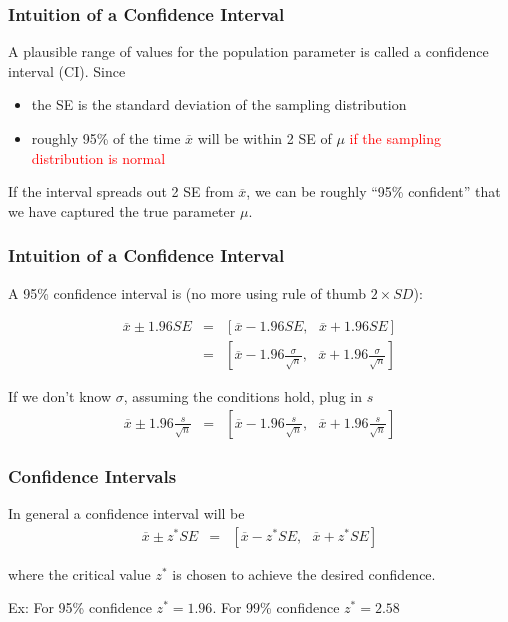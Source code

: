 \documentclass[slides]{beamer}
\newcommand{\blue}[1]{\textcolor{blue2}{#1}}
\newcommand{\red}[1]{\textcolor{red}{#1}}
\newcommand{\xbar}{\overline{x}}
\begin{document}
\begin{frame}[fragile]
\frametitle{Intuition of a Confidence Interval}
A plausible range of values for the population parameter is called a \blue{confidence interval (CI)}.  Since
\begin{itemize}
\pause \item the SE is the standard deviation of the sampling distribution
\pause \item roughly 95\% of the time $\xbar$ will be within 2 SE of $\mu$ \red{if the sampling distribution is normal}
\end{itemize}

\pause If the interval spreads out 2 SE from $\xbar$, we can be roughly
\blue{``95\% confident''} that we have captured the true parameter $\mu$.  
\end{frame}


\begin{frame}[fragile]
\frametitle{Intuition of a Confidence Interval}
A 95\% confidence interval is (no more using rule of thumb $2 \times SD$):

\begin{eqnarray*}
\xbar \pm  1.96 SE &=& \left[\xbar - 1.96 SE, \mbox{  }\xbar + 1.96 SE\right]\\
 &=& \left[\xbar - 1.96 \frac{\sigma}{\sqrt{n}}, \mbox{  }\xbar + 1.96 \frac{\sigma}{\sqrt{n}}\right]
\end{eqnarray*}

\pause If we don't know $\sigma$, assuming the conditions hold, plug in $s$
\begin{eqnarray*}
\xbar \pm 1.96 \frac{s}{\sqrt{n}} &=& \left[\xbar - 1.96 \frac{s}{\sqrt{n}}, \mbox{  }\xbar + 1.96 \frac{s}{\sqrt{n}}\right]
\end{eqnarray*}

\end{frame}


\begin{frame}
\frametitle{Confidence Intervals}

In general a confidence interval will be 
\begin{eqnarray*}
\xbar \pm z^* SE &=& \left[\xbar - z^* SE, \mbox{  }\xbar + z^* SE\right]
\end{eqnarray*}

where the \blue{critical value} $z^*$ is chosen to achieve the desired confidence.\\

\vskip 0.25cm

\pause Ex:  For 95\% confidence $z^*= 1.96$.  For 99\% confidence $z^*=2.58$

\end{frame}
\end{document}
